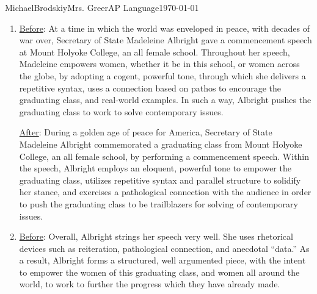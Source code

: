 \documentclass[12pt,letterpaper]{article}
\begin{document}
\begin{mla}{Michael}{Brodskiy}{Mrs. Greer}{AP Language}{\today}{\underline{}} 

  \begin{justifying}

    \begin{enumerate}

      \item \underline{Before}: At a time in which the world was enveloped in peace, with decades of war over, Secretary of State Madeleine Albright gave a commencement speech at Mount Holyoke College, an all female school. Throughout her speech, Madeleine empowers women, whether it be in this school, or women across the globe, by adopting a cogent, powerful tone, through which she delivers a repetitive syntax, uses a connection based on pathos to encourage the graduating class, and real-world examples. In such a way, Albright pushes the graduating class to work to solve contemporary issues.

        \begin{justifying}

          \hspace{10pt}
          \underline{After}: During a golden age of peace for America, Secretary of State Madeleine Albright commemorated a graduating class from Mount Holyoke College, an all female school, by performing a commencement speech. Within the speech, Albright employs an eloquent, powerful tone to empower the graduating class, utilizes repetitive syntax and parallel structure to solidify her stance, and exercises a pathological connection with the audience in order to push the graduating class to be trailblazers for solving of contemporary issues.

        \end{justifying}

        \vspace{10pt}

        \hline

        \vspace{10pt}


      \item \underline{Before}: Overall, Albright strings her speech very well. She uses rhetorical devices such as reiteration, pathological connection, and anecdotal ``data.'' As a result, Albright forms a structured, well argumented piece, with the intent to empower the women of this graduating class, and women all around the world, to work to further the progress which they have already made. 


\end{enumerate}
\end{justifying}
\end{mla}
\end{document}

